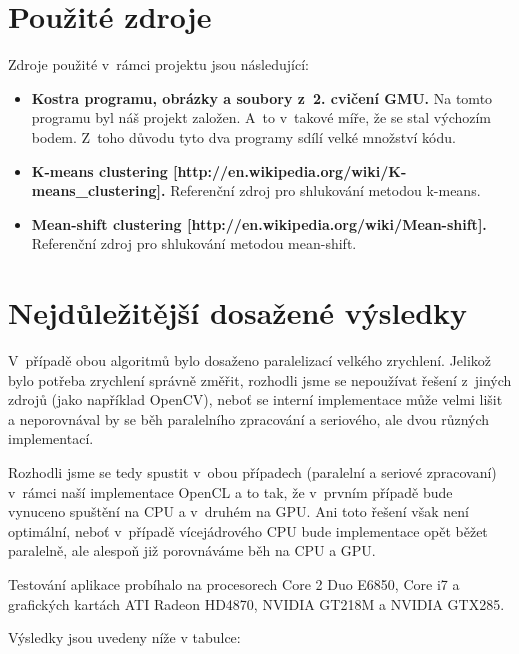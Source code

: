 \documentclass[11pt,a4paper]{article}
\begin{document}
\section{Použité zdroje}
Zdroje použité v~rámci projektu jsou následující:
\begin{itemize}
  \item \textbf{Kostra programu, obrázky a soubory z~2. cvičení GMU.} Na tomto programu byl náš projekt založen. A~to v~takové míře, že se stal výchozím bodem. Z~toho důvodu tyto dva programy sdílí velké množství kódu.
  \item \textbf{K-means clustering [http://en.wikipedia.org/wiki/K-means\_clustering].} Referenční zdroj pro shlukování metodou k-means.
  \item \textbf{Mean-shift clustering [http://en.wikipedia.org/wiki/Mean-shift].} Referenční zdroj pro shlukování metodou mean-shift.
\end{itemize}


\section{Nejdůležitější dosažené výsledky}
V~případě obou algoritmů bylo dosaženo paralelizací velkého zrychlení. Jelikož bylo potřeba zrychlení správně změřit, rozhodli jsme se nepoužívat řešení z~jiných zdrojů (jako například OpenCV), neboť se interní implementace může velmi lišit a neporovnával by se běh paralelního zpracování a seriového, ale dvou různých implementací.

Rozhodli jsme se tedy spustit v~obou případech (paralelní a seriové zpracovaní) v~rámci naší implementace OpenCL a to tak, že v~prvním případě bude vynuceno spuštění na CPU a v~druhém na GPU. Ani toto řešení však není optimální, neboť v~případě vícejádrového CPU bude implementace opět běžet paralelně, ale alespoň již porovnáváme běh na CPU a GPU.

Testování aplikace probíhalo na procesorech Core 2 Duo E6850, Core i7 a grafických kartách ATI Radeon HD4870, NVIDIA GT218M a NVIDIA GTX285.

Výsledky jsou uvedeny níže v tabulce:
\end{document}
